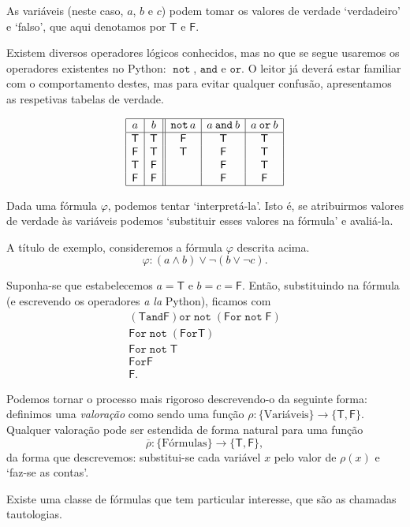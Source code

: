 \documentclass{report}
\theoremstyle{definition}
\theoremstyle{remark}
\newcommand{\lt}{\mathsf{T}}
\newcommand{\lf}{\mathsf{F}}
\DeclareMathOperator{\pnot}{\texttt{not}}
\newcommand{\pand}{\mathbin{\texttt{and}}}
\newcommand{\por}{\mathbin{\texttt{or}}}
\begin{document}
	As variáveis (neste caso, $a$, $b$ e $c$) podem tomar os valores de verdade `verdadeiro' e `falso', que aqui denotamos por $\lt$ e $\lf$.
	
	Existem diversos operadores lógicos conhecidos, mas no que se segue usaremos os operadores existentes no Python: $\pnot$, $\pand$ e $\por$. O leitor já deverá estar familiar com o comportamento destes, mas para evitar qualquer confusão, apresentamos as respetivas tabelas de verdade.
	
	\[\label{tabela:operadores}
	\begin{array}{|c|c||c|c|c|}
	\hline
	a & b & \pnot a & a \pand b & a \por b\\
	\hline
	\lt & \lt & \lf & \lt & \lt\\
	\lf & \lt & \lt & \lf & \lt\\
	\lt & \lf &     & \lf & \lt\\
	\lf & \lf &     & \lf & \lf\\
	\hline
	\end{array}
	\]
	
	Dada uma fórmula $\varphi$, podemos tentar `interpretá-la'. Isto é, se atribuirmos valores de verdade às variáveis podemos `substituir esses valores na fórmula' e avaliá-la.
	
	A título de exemplo, consideremos a fórmula $\varphi$ descrita acima.
	\[\varphi : (a \land b) \lor \neg (b \lor \neg c).\]
	
	Suponha-se que estabelecemos $a = \lt$ e $b = c = \lf$. Então, substituindo na fórmula (e escrevendo os operadores \textit{a la} Python), ficamos com
	\begin{gather*}
	(\lt \pand \lf) \por \pnot (\lf \por \pnot \lf)\\
	\lf \por \pnot (\lf \por \lt)\\
	\lf \por \pnot \lt\\
	\lf \por \lf\\
	\lf.
	\end{gather*}
	
	Podemos tornar o processo mais rigoroso descrevendo-o da seguinte forma: definimos uma \emph{valoração} como sendo uma função $\rho : \{\text{Variáveis}\} \to \{\lt, \lf\}$. Qualquer valoração pode ser estendida de forma natural para uma função
	\[{\overline\rho : \{\text{Fórmulas}\} \to \{\lt, \lf\}},\]
	da forma que descrevemos: substitui-se cada variável $x$ pelo valor de $\rho(x)$ e `faz-se as contas'.
	
	Existe uma classe de fórmulas que tem particular interesse, que são as chamadas tautologias.
	
\end{document}
